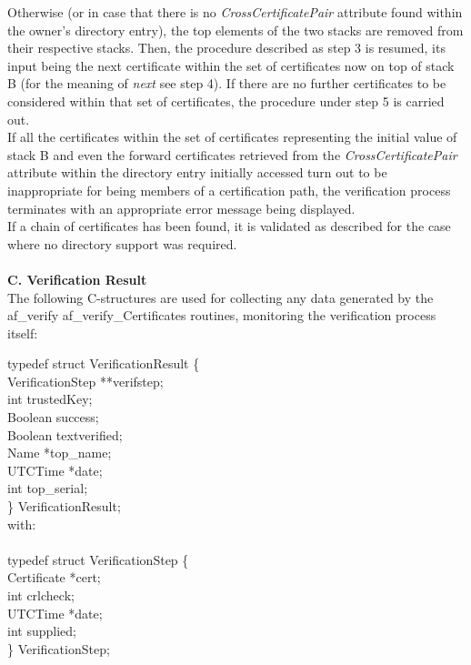 Otherwise (or in case that there is no {\em CrossCertificatePair} attribute 
found within the owner's directory entry), the top elements of the two stacks
are removed from their respective stacks. Then, the procedure described
as step 3 is resumed, its input being the next certificate within the
set of certificates now on top of stack B (for the meaning of {\em next}
see step 4). If there are no further certificates to be considered 
within that set of certificates, the procedure under step 5 is carried out.
\\ [1em]
If all the certificates within the set of certificates representing
the initial value of stack B and even the forward certificates 
retrieved from the {\em CrossCertificatePair} attribute within the
directory entry initially accessed turn out to be inappropriate 
for being members of a certification path, the verification process
terminates with an appropriate error message being displayed.
\\ [1em]
If a chain of certificates has been found, it is validated as described for the
case where no directory support was required. \\ \\
{\bf C. Verification Result}
\\ [1em]
The following C-structures are used for collecting any data generated by the af\_verify
af\_verify\_Certificates routines, monitoring the verification process itself: 

{\small
\btab
\1      typedef struct VerificationResult \{ \\
\2		VerificationStep \2 **verifstep; \\
\2		int \2	             trustedKey; \\
\2		Boolean \2	     success; \\
\2		Boolean \2	     textverified; \\
\2		Name \2		    *top\_name; \\
\2		UTCTime \2 	    *date; \\
\2		int \2		     top\_serial; \\
\1       \} VerificationResult; \\
\etab
}
with: \\ \\
{\small
\btab
\1      typedef struct VerificationStep \{ \\
\2		Certificate \2	*cert; \\
\2		int \2		crlcheck; \\
\2		UTCTime	\2	*date; \\
\2		int \2		supplied; \\
\1       \} VerificationStep; \\
\etab
}

